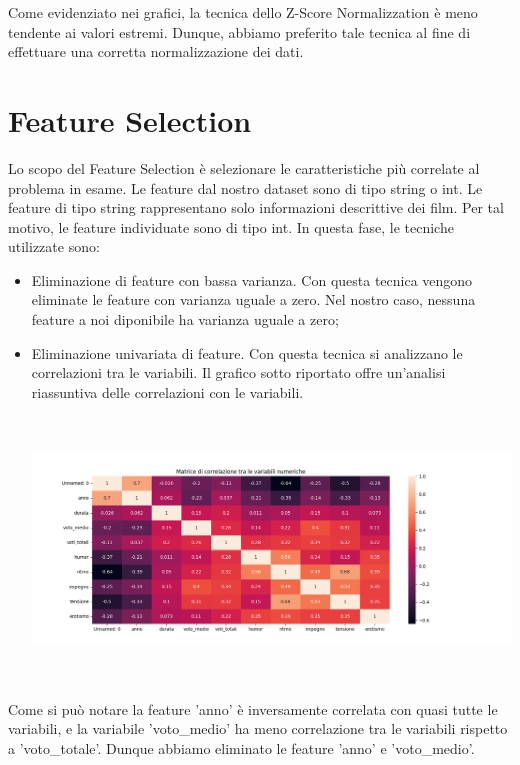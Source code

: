 \documentclass[a4paper, 10pt]{report}
\begin{document}
            Come evidenziato nei grafici, la tecnica dello Z-Score Normalizzation è meno tendente ai valori estremi.
            Dunque, abbiamo preferito tale tecnica al fine di effettuare una corretta normalizzazione dei dati.

        \section{Feature Selection}\label{sec:feature-selection}
            Lo scopo del Feature Selection è selezionare le caratteristiche più correlate al problema in esame.
            Le feature dal nostro dataset sono di tipo string o int. Le feature di tipo string rappresentano
            solo informazioni descrittive dei film. Per tal motivo, le feature individuate sono di tipo int.
            In questa fase, le tecniche utilizzate sono:
            \begin{itemize}
                \item Eliminazione di feature con bassa varianza. Con questa tecnica vengono eliminate le feature
                con varianza uguale a zero. Nel nostro caso, nessuna feature a noi diponibile ha varianza uguale a zero;
                \item Eliminazione univariata di feature. Con questa tecnica si analizzano le correlazioni tra le variabili.
                Il grafico sotto riportato offre un'analisi riassuntiva delle correlazioni con le variabili.
                \begin{center}
                    \includegraphics[width=13cm, height=7cm]{dataPreparation/Matrice di Correlazione.png}\\
                \end{center}
            \end{itemize}

            Come si può notare la feature 'anno' è inversamente correlata con quasi tutte le variabili, e la variabile
            'voto\_medio' ha meno correlazione tra le variabili rispetto a 'voto\_totale'.
            Dunque abbiamo eliminato le feature 'anno' e 'voto\_medio'.
\end{document}
